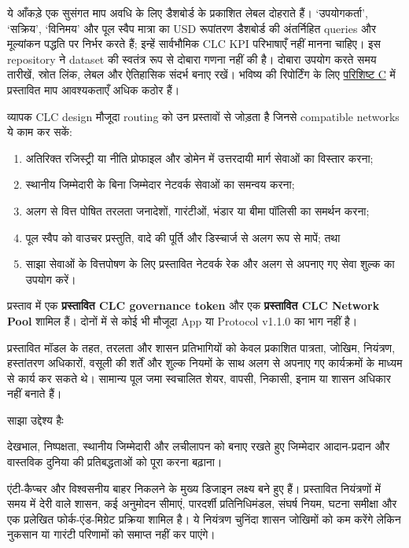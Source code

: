 \documentclass[11pt]{article}
\begin{document}
ये आँकड़े एक सुसंगत माप अवधि के लिए डैशबोर्ड के प्रकाशित लेबल दोहराते हैं। `उपयोगकर्ता', `सक्रिय', `विनिमय' और पूल स्वैप मात्रा का USD रूपांतरण डैशबोर्ड की अंतर्निहित queries और मूल्यांकन पद्धति पर निर्भर करते हैं; इन्हें सार्वभौमिक CLC KPI परिभाषाएँ नहीं मानना चाहिए। इस repository ने dataset की स्वतंत्र रूप से दोबारा गणना नहीं की है। दोबारा उपयोग करते समय तारीखें, स्रोत लिंक, लेबल और ऐतिहासिक संदर्भ बनाए रखें। भविष्य की रिपोर्टिंग के लिए \href{https://docs.cosmolocal.credit/hi/white-paper/appendix-c-kpi-definitions}{परिशिष्ट C} में प्रस्तावित माप आवश्यकताएँ अधिक कठोर हैं।

व्यापक CLC design मौजूदा routing को उन प्रस्तावों से जोड़ता है जिनसे compatible networks ये काम कर सकें:

\begin{enumerate}[leftmargin=*]
\item अतिरिक्त रजिस्ट्री या नीति प्रोफाइल और डोमेन में उत्तरदायी मार्ग सेवाओं का विस्तार करना;
\item स्थानीय जिम्मेदारी के बिना जिम्मेदार नेटवर्क सेवाओं का समन्वय करना;
\item अलग से वित्त पोषित तरलता जनादेशों, गारंटीओं, भंडार या बीमा पॉलिसी का समर्थन करना;
\item पूल स्वैप को वाउचर प्रस्तुति, वादे की पूर्ति और डिस्चार्ज से अलग रूप से मापें; तथा
\item साझा सेवाओं के वित्तपोषण के लिए प्रस्तावित नेटवर्क रेक और अलग से अपनाए गए सेवा शुल्क का उपयोग करें।
\end{enumerate}
प्रस्ताव में एक \textbf{प्रस्तावित CLC governance token} और एक \textbf{प्रस्तावित CLC Network Pool} शामिल हैं। दोनों में से कोई भी मौजूदा App या Protocol v1.1.0 का भाग नहीं है।

प्रस्तावित मॉडल के तहत, तरलता और शासन प्रतिभागियों को केवल प्रकाशित पात्रता, जोखिम, नियंत्रण, हस्तांतरण अधिकारों, वसूली की शर्तें और शुल्क नियमों के साथ अलग से अपनाए गए कार्यक्रमों के माध्यम से कार्य कर सकते थे। सामान्य पूल जमा स्वचालित शेयर, वापसी, निकासी, इनाम या शासन अधिकार नहीं बनाते हैं।

साझा उद्देश्य हैः

देखभाल, निष्पक्षता, स्थानीय जिम्मेदारी और लचीलापन को बनाए रखते हुए जिम्मेदार आदान-प्रदान और वास्तविक दुनिया की प्रतिबद्धताओं को पूरा करना बढ़ाना।

एंटी-कैप्चर और विश्वसनीय बाहर निकलने के मुख्य डिजाइन लक्ष्य बने हुए हैं। प्रस्तावित नियंत्रणों में समय में देरी वाले शासन, कई अनुमोदन सीमाएं, पारदर्शी प्रतिनिधिमंडल, संघर्ष नियम, घटना समीक्षा और एक प्रलेखित फोर्क-एंड-मिग्रेट प्रक्रिया शामिल है। ये नियंत्रण चुनिंदा शासन जोखिमों को कम करेंगे लेकिन नुकसान या गारंटी परिणामों को समाप्त नहीं कर पाएंगे।
\end{document}
